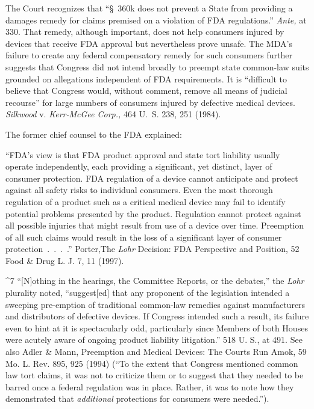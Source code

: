 {{  The Court recognizes that ``\S~360k does not prevent a State from
providing a damages remedy for claims premised on a violation of FDA
regulations.'' \emph{Ante,} at 330. That remedy, although important,
does not help consumers injured by devices that receive FDA approval but
nevertheless prove unsafe. The MDA's failure to create any federal
compensatory remedy for such consumers further suggests that Congress
did not intend broadly to preempt state common-law suits grounded on
allegations independent of FDA requirements. It is ``difficult to
believe that Congress would, without comment, remove all means of
judicial recourse'' for large numbers of consumers injured by defective
medical devices. \emph{Silkwood} v. \emph{Kerr-McGee Corp.,} 464 U.~S. 238,
251 (1984).

  The former chief counsel to the FDA explained:

      ``FDA's view is that FDA product approval and state tort
    liability usually operate independently, each providing a
    significant, yet distinct, layer of consumer protection. FDA
    regulation of a device cannot anticipate and protect against all
    safety risks to individual consumers. Even the most thorough
    regulation of a product such as a critical medical device may fail
    to identify potential problems presented by the product. Regulation
    cannot \newpage  protect against all possible injuries that might
    result from use of a device over time. Preemption of all such
    claims would result in the loss of a significant layer of consumer
    protection~.~.~.~.'' Porter,The \emph{Lohr} Decision: FDA
    Perspective and Position, 52 Food \& Drug L. J. 7, 11 (1997).

^7 ``[N]othing in the hearings, the Committee Reports, or the
debates,'' the \emph{Lohr} plurality noted, ``suggest[ed] that any
proponent of the legislation intended a sweeping pre-emption of
traditional common-law remedies against manufacturers and distributors
of defective devices. If Congress intended such a result, its failure
even to hint at it is spectacularly odd, particularly since Members
of both Houses were acutely aware of ongoing product liability
litigation.'' 518 U. S., at 491. See also Adler \& Mann, Preemption and
Medical Devices: The Courts Run Amok, 59 Mo. L. Rev. 895, 925 (1994)
(``To the extent that Congress mentioned common law tort claims, it
was not to criticize them or to suggest that they needed to be barred
once a federal regulation was in place. Rather, it was to note how
they demonstrated that \emph{additional} protections for consumers were
needed.'').

}}
